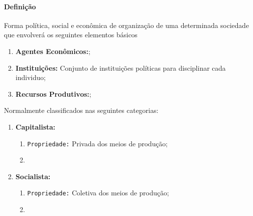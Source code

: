 \documentclass{article}
\begin{document}
            \paragraph{Definição}Forma política, social e econômica de organização de uma determinada sociedade que envolverá os seguintes elementos básicos
                \begin{enumerate}[noitemsep, rightmargin = \leftmargin]
                    \item \textbf{Agentes Econômicos:};

                    \item \textbf{Instituições:} Conjunto de instituições políticas para disciplinar cada individuo;

                    \item \textbf{Recursos Produtivos:};
                \end{enumerate}
            Normalmente classificados nas seguintes categorias:
                \begin{multicols}{2}
                    \begin{enumerate}[rightmargin = \leftmargin]
                        \item \textbf{Capitalista:}
                            \begin{enumerate}[noitemsep]
                                \item \texttt{Propriedade:} Privada dos meios de produção;
                                \item \texttt{}
                            \end{enumerate}

                        \columnbreak

                        \item \textbf{Socialista:}
                            \begin{enumerate}[noitemsep]
                                \item \texttt{Propriedade:} Coletiva dos meios de produção;
                                \item \texttt{}
                            \end{enumerate}
                    \end{enumerate}
                \end{multicols}
\end{document}
